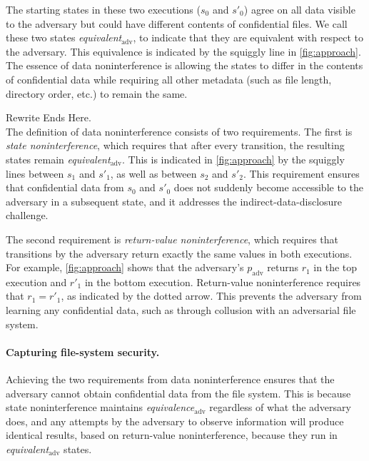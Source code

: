 The starting states in these two executions ($s_0$ and $s'_0$)
agree on all data visible to the adversary but could have
different contents of confidential files.  We call these two states
\emph{equivalent}$_\mathrm{adv}$, to indicate that they are equivalent
with respect to the adversary.  This equivalence is indicated by the
squiggly line in \ref{fig:approach}.  The essence of data noninterference
is allowing the states to differ in the contents of confidential data
while requiring all other metadata (such as file length, directory order,
etc.) to remain the same.

{\color{red} Rewrite Ends Here. }\\

The definition of data noninterference consists of two
requirements.  The first is \emph{state noninterference},
which requires that after every transition, the resulting states
remain \emph{equivalent}$_\mathrm{adv}$.  This is indicated in
\ref{fig:approach} by the squiggly lines between $s_1$ and $s'_1$,
as well as between $s_2$ and $s'_2$.  This requirement ensures that
confidential data from $s_0$ and $s'_0$ does not suddenly become
accessible to the adversary in a subsequent state, and it addresses the
indirect-data-disclosure challenge.

The second requirement is \emph{return-value noninterference},
which requires that transitions by the adversary return exactly the
same values in both executions.  For example, \ref{fig:approach}
shows that the adversary's $p_\mathrm{adv}$ returns $r_1$ in the top
execution and $r'_1$ in the bottom execution.  Return-value noninterference
requires that $r_1=r'_1$, as indicated by the dotted
arrow.  This prevents the adversary
from learning any confidential data, such as through collusion with an
adversarial file system.


\paragraph{Capturing file-system security.}

Achieving the two requirements from data noninterference ensures
that the adversary cannot obtain confidential data from the
file system.  This is because state noninterference maintains
\emph{equivalence}$_\mathrm{adv}$ regardless of what the adversary does, and any attempts by the adversary to observe
information will produce identical results, based on return-value
noninterference,
because they run in \emph{equivalent}$_\mathrm{adv}$ states.

